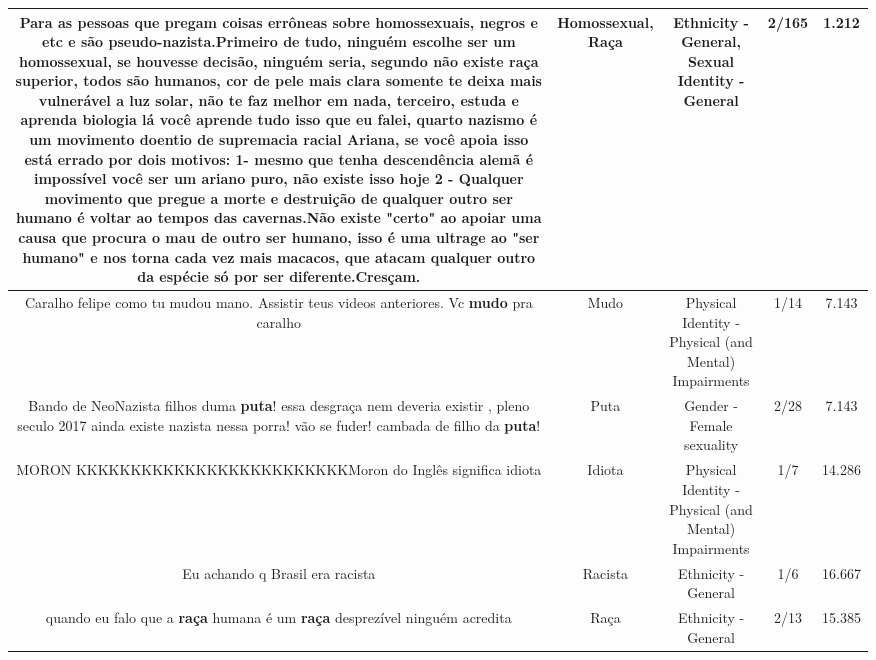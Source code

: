 \documentclass[11pt]{article}
\newlength\mylength
\begin{document}
\begin{center}
\begin{longtable}{|C{.65\mylength}|C{.30\mylength}|C{.12\mylength}|C{.12\mylength}|C{.12\mylength}|}
  \small Para as pessoas que pregam coisas errôneas sobre homossexuais, negros e etc e são pseudo-nazista.Primeiro de tudo, ninguém escolhe ser um \textbf{homossexual}, se houvesse decisão, ninguém seria, segundo não existe \textbf{raça} superior, todos são humanos, cor de pele mais clara somente te deixa mais vulnerável a luz solar, não te faz melhor em nada, terceiro, estuda e aprenda biologia lá você aprende tudo isso que eu falei, quarto nazismo é um movimento doentio de supremacia racial Ariana, se você apoia isso está errado por dois motivos: 1- mesmo que tenha descendência alemã é impossível você ser um ariano puro, não existe isso hoje 2 - Qualquer movimento que pregue a morte e destruição de qualquer outro ser humano é voltar ao tempos das cavernas.Não existe "certo" ao apoiar uma causa que procura o mau de outro ser humano, isso é uma ultrage ao "ser humano" e nos torna cada vez mais macacos, que atacam qualquer outro da espécie só por ser diferente.Cresçam.\normalsize   & Homossexual, Raça & Ethnicity - General, Sexual Identity - General & 2/165 & 1.212 \\  \hline
  \small Caralho felipe como tu mudou mano. Assistir teus videos anteriores. Vc \textbf{mudo} pra caralho\normalsize   & Mudo & Physical Identity - Physical (and Mental) Impairments & 1/14 & 7.143 \\  \hline
  \small Bando de NeoNazista filhos duma \textbf{puta}! essa desgraça nem deveria existir , pleno seculo 2017 ainda existe nazista nessa porra! vão se fuder! cambada de filho da \textbf{puta}!\normalsize   & Puta & Gender - Female sexuality & 2/28 & 7.143 \\  \hline
  \small MORON KKKKKKKKKKKKKKKKKKKKKKKKKMoron do Inglês significa idiota\normalsize   & Idiota & Physical Identity - Physical (and Mental) Impairments & 1/7 & 14.286 \\  \hline
  \small Eu achando q Brasil era racista\normalsize   & Racista & Ethnicity - General & 1/6 & 16.667 \\  \hline
  \small quando eu falo que a \textbf{raça} humana é um \textbf{raça} desprezível ninguém acredita\normalsize   & Raça & Ethnicity - General & 2/13 & 15.385 \\  \hline

\end{longtable}
\end{center}
\end{document}
